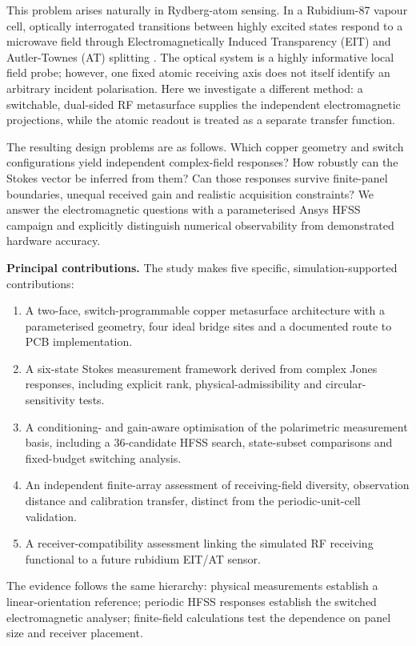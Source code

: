\documentclass{ieeeaccess}
\begin{document}
This problem arises naturally in Rydberg-atom sensing. In a Rubidium-87 vapour cell, optically interrogated transitions between highly excited states respond to a microwave field through Electromagnetically Induced Transparency (EIT) and Autler-Townes (AT) splitting \cite{Sedlacek2012,Sedlacek2013,Schlossberger2024,Verghese2026ICTON}. The optical system is a highly informative local field probe; however, one fixed atomic receiving axis does not itself identify an arbitrary incident polarisation. Here we investigate a different method: a switchable, dual-sided RF metasurface supplies the independent electromagnetic projections, while the atomic readout is treated as a separate transfer function.

The resulting design problems are as follows. Which copper geometry and switch configurations yield independent complex-field responses? How robustly can the Stokes vector be inferred from them? Can those responses survive finite-panel boundaries, unequal received gain and realistic acquisition constraints? We answer the electromagnetic questions with a parameterised Ansys HFSS campaign and explicitly distinguish numerical observability from demonstrated hardware accuracy.

\noindent\textbf{Principal contributions.} The study makes five specific, simulation-supported contributions:
\begin{enumerate}
\item A two-face, switch-programmable copper metasurface architecture with a parameterised geometry, four ideal bridge sites and a documented route to PCB implementation.
\item A six-state Stokes measurement framework derived from complex Jones responses, including explicit rank, physical-admissibility and circular-sensitivity tests.
\item A conditioning- and gain-aware optimisation of the polarimetric measurement basis, including a 36-candidate HFSS search, state-subset comparisons and fixed-budget switching analysis.
\item An independent finite-array assessment of receiving-field diversity, observation distance and calibration transfer, distinct from the periodic-unit-cell validation.
\item A receiver-compatibility assessment linking the simulated RF receiving functional to a future rubidium EIT/AT sensor.
\end{enumerate}

The evidence follows the same hierarchy: physical measurements establish a linear-orientation reference; periodic HFSS responses establish the switched electromagnetic analyser; finite-field calculations test the dependence on panel size and receiver placement.
\end{document}
